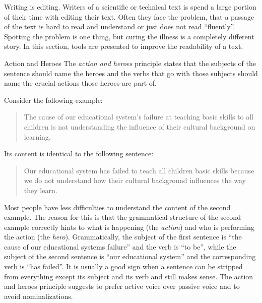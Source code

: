 Writing is editing.
Writers of a scientific or technical text is spend a large portion of their time with editing their text. 
Often they face the problem, that a passage of the text is hard to read and understand or just does not read ``fluently''.
Spotting the problem is one thing, but curing the illness is a completely different story. 
In this section, tools are presented to improve the readability of a text.
  
{Action and Heroes} %
The \emph{action and heroes} principle states that the subjects of the sentence should name the heroes
and the verbs that go with those subjects should name the crucial actions those heroes are part of.
 
Consider the following example:
\begin{quote}
	\small
	The cause of our educational system's failure at teaching basic skills to all children is not understanding the influence of their cultural background on learning.
\end{quote} 
Its content is identical to the following sentence:
\begin{quote}
	\small
	Our educational system has failed to teach all children	basic skills because we do not understand how their cultural background influences the way they learn.
\end{quote}
Most people have less difficulties to understand the content of the second example. 
The reason for this is that the grammatical structure of the second example correctly hints to what is happening (the \emph{action}) and who is performing the action (the \emph{hero}). 
Grammatically, the subject of the first sentence is ``{the cause of our educational systems failure}'' and the verb is ``to be'', while the subject of the second sentence is ``our educational system'' and the corresponding verb is ``has failed''. 
It is usually a good sign when a sentence can be stripped from everything except its subject and its verb and still makes sense. 
The action and heroes principle suggests to prefer active voice over passive voice and to avoid nominalizations.
